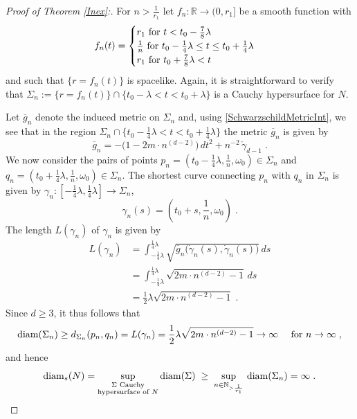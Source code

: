 \documentclass[reqno]{article}
\newcommand{\N}{\mathbb{N}}
\newcommand{\R}{\mathbb{R}}
\newcommand{\diam}{\mathrm{diam}}
\begin{document}
\begin{proof}[Proof of Theorem \ref{Inex}:]
For $n > \frac{1}{r_1}$ let $f_n : \R \to (0, r_1]$ be a smooth function with
\begin{equation*}
f_n(t) = \begin{cases} r_1 \textnormal{ for } t < t_0 - \frac{7}{8}\lambda \\
\frac{1}{n} \textnormal { for } t_0 - \frac{1}{4}\lambda \leq t \leq t_0 + \frac{1}{4}\lambda \\
r_1 \textnormal{ for } t_0 + \frac{7}{8}\lambda < t \end{cases}
\end{equation*}
and such that $\{r = f_n(t)\}$ is spacelike. Again, it is straightforward to verify that $\Sigma_n := \{r = f_n(t)\} \cap \{t_0 - \lambda < t < t_0 + \lambda\}$ is a Cauchy hypersurface for $N$.
\begin{center}
\def\svgwidth{12cm}

\end{center}
Let $\overline{g}_n$ denote the induced metric on $\Sigma_n$ and, using \eqref{SchwarzschildMetricInt}, we see that in the region $\Sigma_n \cap \{t_0 - \frac{1}{4}\lambda < t < t_0 + \frac{1}{4} \lambda\}$ the metric $\overline{g}_n$ is given by
\begin{equation*}
\overline{g}_n = -\big(1 - 2m\cdot n^{(d-2)}\big) \,dt^2 + n^{-2}\, \mathring{\gamma}_{d-1} \;.
\end{equation*}
We now consider the pairs of points $p_n = (t_0 - \frac{1}{4}\lambda, \frac{1}{n}, \omega_0) \in \Sigma_n$ and $q_n = (t_0 + \frac{1}{4}\lambda, \frac{1}{n}, \omega_0) \in \Sigma_n$.
The shortest curve connecting $p_n$ with $q_n$ in $\Sigma_n$ is given by
 $\gamma_n : [-\frac{1}{4}\lambda, \frac{1}{4}\lambda] \to \Sigma_n$, 
\begin{equation*}
\gamma_n (s) = ( t_0 + s, \frac{1}{n}, \omega_0) \;.
\end{equation*}
The length $L(\gamma_n)$ of $\gamma_n$ is given by
\begin{equation*}
\begin{split}
L(\gamma_n) &= \int_{-\frac{1}{4}\lambda}^{\frac{1}{4}\lambda} \sqrt{\overline{g}_n \big(\dot{\gamma}_n(s), \dot{\gamma}_n(s)\big)} \, ds \\
&= \int_{-\frac{1}{4}\lambda}^{\frac{1}{4}\lambda} \sqrt{2m \cdot n^{(d-2)} -1} \, ds \\ 
&= \frac{1}{2} \lambda \sqrt{2m \cdot n^{(d-2)} -1} \;.
\end{split}
\end{equation*}
Since $d \geq 3$, it thus follows that
\begin{equation*}
\diam(\Sigma_n) \geq d_{\Sigma_n}(p_n, q_n) = L(\gamma_n) = \frac{1}{2} \lambda \sqrt{2m \cdot n^{(d-2)} -1} \to \infty \quad \textnormal{ for } n \to \infty \;,
\end{equation*}
and hence
\begin{equation*}
\diam_s(N) = \sup_{\substack{\Sigma \textnormal{ Cauchy} \\ \textnormal{hypersurface of } N}} \diam(\Sigma) \; \geq \; \sup_{n \in \N_{> \frac{1}{r_1}}} \,\diam (\Sigma_n) = \infty \;.
\end{equation*}
\vspace*{2mm}





\end{proof}
\end{document}

